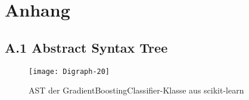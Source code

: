 \documentclass[german,bachelor]{swsLeipzig}
\begin{document}



\appendix
\chapter*{Anhang}
\section*{A.1 Abstract Syntax Tree}
\renewcommand{\thefigure}{A.1}
\begin{figure}[h]
 \centering
 \texttt{[image: Digraph-20]}
 \caption{AST der GradientBoostingClassifier-Klasse aus scikit-learn}
 \label{fig:asdt}
\end{figure}
\


\end{document}

